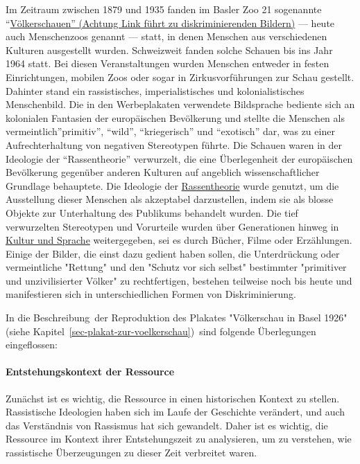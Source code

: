 \documentclass[
  letterpaper,
  DIV=11,
  numbers=noendperiod,
  landscape,
  a4paper,
  geometry:margin=1in]{scrartcl}
\let\oldparagraph\paragraph
\renewcommand{\paragraph}[1]{\oldparagraph{#1}\mbox{}}
\begin{document}
Im Zeitraum zwischen 1879 und 1935 fanden im Basler Zoo 21 sogenannte
``\href{https://www.baslerstadtbuch.ch/stadtbuch/1992/1992_2247.html}{Völkerschauen''
(Achtung Link führt zu diskriminierenden Bildern)} --- heute auch
Menschenzoos genannt --- statt, in denen Menschen aus verschiedenen
Kulturen ausgestellt wurden. Schweizweit fanden solche Schauen bis ins
Jahr 1964 statt. Bei diesen Veranstaltungen wurden Menschen entweder in
festen Einrichtungen, mobilen Zoos oder sogar in Zirkusvorführungen zur
Schau gestellt. Dahinter stand ein rassistisches, imperialistisches und
kolonialistisches Menschenbild. Die in den Werbeplakaten verwendete
Bildsprache bediente sich an kolonialen Fantasien der europäischen
Bevölkerung und stellte die Menschen als vermeintlich''primitiv'',
``wild'', ``kriegerisch'' und ``exotisch'' dar, was zu einer
Aufrechterhaltung von negativen Stereotypen führte. Die Schauen waren in
der Ideologie der ``Rassentheorie'' verwurzelt, die eine Überlegenheit
der europäischen Bevölkerung gegenüber anderen Kulturen auf angeblich
wissenschaftlicher Grundlage behauptete. Die Ideologie der
\href{https://hls-dhs-dss.ch/de/articles/060537/2024-04-08/}{Rassentheorie}
wurde genutzt, um die Ausstellung dieser Menschen als akzeptabel
darzustellen, indem sie als blosse Objekte zur Unterhaltung des
Publikums behandelt wurden. Die tief verwurzelten Stereotypen und
Vorurteile wurden über Generationen hinweg in
\href{https://mirsindvoda.ch/voelkerschauen-in-der-schweiz/}{Kultur und
Sprache} weitergegeben, sei es durch Bücher, Filme oder Erzählungen.
Einige der Bilder, die einst dazu gedient haben sollen, die
Unterdrückung oder vermeintliche "Rettung" und den "Schutz vor sich
selbst" bestimmter "primitiver und unzivilisierter Völker" zu
rechtfertigen, bestehen teilweise noch bis heute und manifestieren sich
in unterschiedlichen Formen von Diskriminierung.

In die Beschreibung~der Reproduktion des Plakates "Völkerschau in Basel
1926" (siehe Kapitel~\ref{sec-plakat-zur-voelkerschau})~sind folgende
Überlegungen eingeflossen:

\paragraph{Entstehungskontext der
Ressource}\label{entstehungskontext-der-ressource}

Zunächst ist es wichtig, die Ressource in einen historischen Kontext zu
stellen. Rassistische Ideologien haben sich im Laufe der Geschichte
verändert, und auch das Verständnis von Rassismus hat sich gewandelt.
Daher ist es wichtig, die Ressource im Kontext ihrer Entstehungszeit zu
analysieren, um zu verstehen, wie rassistische Überzeugungen zu dieser
Zeit verbreitet waren.
\end{document}
